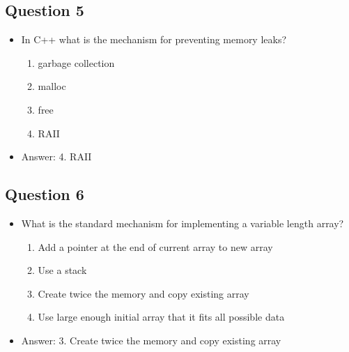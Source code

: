 \begin{slide}
\section[-1]{Question 5}

\begin{PauseHighLight}
  \begin{itemize}
  \item In C++ what is the mechanism for preventing memory leaks?
    \begin{enumerate}
    \item garbage collection
    \item malloc
    \item free
    \item RAII\pause
    \end{enumerate}
  \item Answer: 4. RAII\pauseb
  \end{itemize}
\end{PauseHighLight}
\end{slide}

\begin{slide}
\section[-1]{Question 6}

\begin{PauseHighLight}
  \begin{itemize}
  \item What is the standard mechanism for implementing a variable length array?
    \begin{enumerate}
    \item Add a pointer at the end of current array to new array
    \item Use a stack
    \item Create twice the memory and copy existing array
    \item Use large enough initial array that it fits all possible data\pause
    \end{enumerate}
  \item Answer: 3. Create twice the memory and copy existing array\pauseb
  \end{itemize}
\end{PauseHighLight}
\end{slide}

